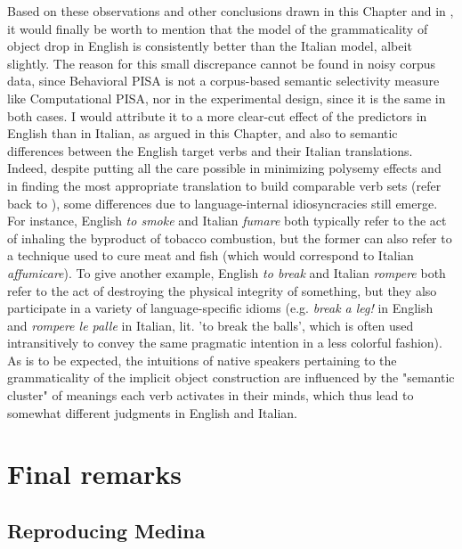 Based on these observations and other conclusions drawn in this Chapter and in , it would finally be worth to mention that the model of the grammaticality of object drop in English is consistently better than the Italian model, albeit slightly. The reason for this small discrepance cannot be found in noisy corpus data, since Behavioral PISA is not a corpus-based semantic selectivity measure like Computational PISA, nor in the experimental design, since it is the same in both cases. I would attribute it to a more clear-cut effect of the predictors in English than in Italian, as argued in this Chapter, and also to semantic differences between the English target verbs and their Italian translations. Indeed, despite putting all the care possible in minimizing polysemy effects and in finding the most appropriate translation to build comparable verb sets (refer back to ), some differences due to language-internal idiosyncracies still emerge. For instance, English \textit{to smoke} and Italian \textit{fumare} both typically refer to the act of inhaling the byproduct of tobacco combustion, but the former can also refer to a technique used to cure meat and fish (which would correspond to Italian \textit{affumicare}). To give another example, English \textit{to break} and Italian \textit{rompere} both refer to the act of destroying the physical integrity of something, but they also participate in a variety of language-specific idioms (e.g. \textit{break a leg!} in English and \textit{rompere le palle} in Italian, lit. 'to break the balls', which is often used intransitively to convey the same pragmatic intention in a less colorful fashion). As is to be expected, the intuitions of native speakers pertaining to the grammaticality of the implicit object construction are influenced by the "semantic cluster" of meanings each verb activates in their minds, which thus lead to somewhat different judgments in English and Italian.


\section{Final remarks} 


\subsection{Reproducing Medina} 

